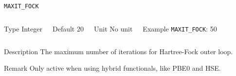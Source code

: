     \begin{frame}[allowframebreaks]{\texttt{MAXIT\_FOCK}} \label{MAXIT_FOCK}
    \vspace*{-12pt}
    \begin{columns}
    \begin{block}{Type}
    Integer
    \end{block}
    
    \begin{block}{Default}
    20
    \end{block}
    
    \begin{block}{Unit}
    No unit
    \end{block}
    
    \begin{block}{Example}
    \texttt{MAXIT\_FOCK}: 50
    \end{block}
    \end{columns}
    
    \begin{block}{Description}
    The maximum number of iterations for Hartree-Fock outer loop.
    \end{block}
    
    \begin{block}{Remark}
    Only active when using hybrid functionals, like PBE0 and HSE. 
    \end{block}
    
    \end{frame}
    
